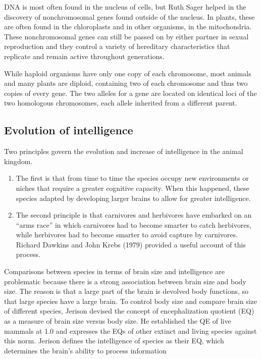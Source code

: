DNA is most often found in the nucleus of cells, but Ruth Sager helped in the discovery of
nonchromosomal genes found outside of the nucleus.
In plants, these are often found in the chloroplasts and in other organisms, in the mitochondria.
These nonchromosomal genes can still be passed on by either partner in sexual reproduction and
they control a variety of hereditary characteristics that replicate and remain active throughout 
generations.

While haploid organisms have only one copy of each chromosome, most animals and many plants are
diploid, containing two of each chromosome and thus two copies of every gene.
The two alleles for a gene are located on identical loci of the two homologous chromosomes,
each allele inherited from a different parent.

\subsection{Evolution of intelligence}
Two principles govern the evolution and increase of intelligence in the animal kingdom.
\begin{enumerate}
	\item The first is that from time to time the species occupy new environments or niches that
		require a greater cognitive capacity. When this happened, these species adapted by
		developing larger brains to allow for greater intelligence.
    \item The second principle is that carnivores and herbivores have embarked on an 
		``arms race'' in which carnivores had to become smarter to catch herbivores,
		while herbivores had to become smarter to avoid capture by carnivores.
		Richard Dawkins and John Krebs (1979) provided a useful account of this process.
\end{enumerate}

Comparisons between species in terms of brain size and intelligence are problematic because there
is a strong association between brain size and body size.
The reason is that a large part of the brain is devolved body functions, so that large species
have a large brain.
To control body size and compare brain size of different species, Jerison devised the concept 
of encephalization quotient (EQ) as a measure of brain size versus body size.
He established the QE of live mammals at 1.0 and expresses the EQs of other extinct and living
species against this norm. Jerison defines the intelligence of species as their EQ,
which determines the brain’s ability to process information

